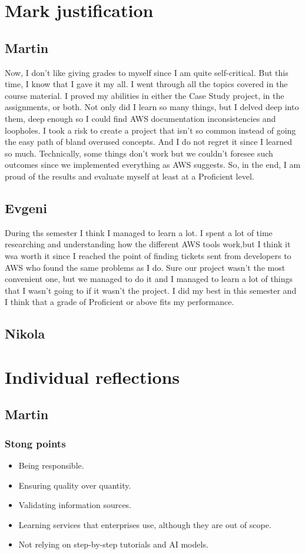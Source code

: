 \documentclass[10pt, a4paper]{article}
\begin{document}
\section{Mark justification}
\subsection{Martin}
Now, I don't like giving grades to myself since I am quite self-critical. But this time, I know that I gave it my all. I went through all the topics covered in the course material. I proved my abilities in either the Case Study project, in the assignments, or both. Not only did I learn so many things, but I delved deep into them, deep enough so I could find AWS documentation inconsistencies and loopholes. I took a risk to create a project that isn't so common instead of going the easy path of bland overused concepts. And I do not regret it since I learned so much. Technically, some things don't work but we couldn't foresee such outcomes since we implemented everything as AWS suggests. So, in the end, I am proud of the results and evaluate myself at least at a Proficient level.

\subsection{Evgeni}
During ths semester I think I managed to learn a lot. I spent a lot of time researching and understanding how the different AWS tools work,but I think it wsa worth it
since I reached the point of finding tickets sent from developers to AWS who found the same problems as I do. Sure our project wasn't the most convenient one, but we 
managed to do it and I managed to learn a lot of things that I wasn't going to if it wasn't the project. I did my best in this semester and I think that a grade of Proficient or above fits my performance. 

\subsection{Nikola}

\section{Individual reflections}
\subsection{Martin}
\subsubsection{Stong points}
\begin{itemize}
	\item Being responsible.
	\item Ensuring quality over quantity.
	\item Validating information sources.
	\item Learning services that enterprises use, although they are out of scope.
	\item Not relying on step-by-step tutorials and AI models.
\end{itemize}
\end{document}
